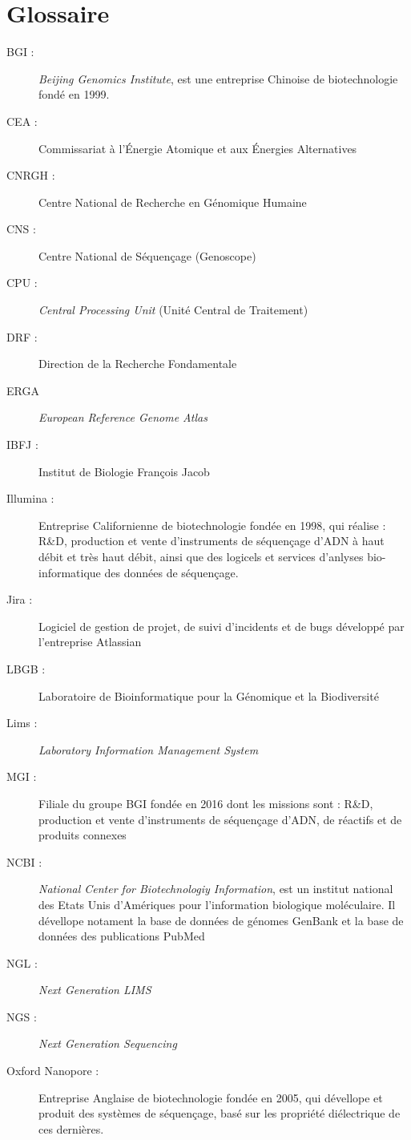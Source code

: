 \section*{Glossaire}

\begin{description}
    \item[BGI : ] \emph{Beijing Genomics Institute}, est une entreprise Chinoise de biotechnologie fondé en 1999.
    \item[CEA :] Commissariat à l'Énergie Atomique et aux Énergies Alternatives
    \item[CNRGH :] Centre National de Recherche en Génomique Humaine 
    \item[CNS :] Centre National de Séquençage (Genoscope)
    \item[CPU :] \emph{Central Processing Unit} (Unité Central de Traitement)
    \item[DRF :] Direction de la Recherche Fondamentale
    \item[ERGA] \emph{European Reference Genome Atlas}
    \item[IBFJ :] Institut de Biologie François Jacob
    \item[Illumina :] Entreprise Californienne de biotechnologie fondée en 1998, qui réalise : R\&D, production et vente d’instruments de séquençage d’ADN à haut débit et très haut débit, ainsi que des logicels et services d'anlyses bio-informatique des données de séquençage.
    \item[Jira :] Logiciel de gestion de projet, de suivi d'incidents et de bugs développé par l'entreprise Atlassian
    \item[LBGB :] Laboratoire de Bioinformatique pour la Génomique et la Biodiversité
    \item[Lims :] \emph{Laboratory Information Management System}
    \item[MGI : ] Filiale du groupe BGI fondée en 2016 dont les missions sont : R\&D, production et vente d’instruments de séquençage 
    d’ADN, de réactifs et de produits connexes
    \item[NCBI :] \emph{National Center for Biotechnologiy Information}, est un institut national des Etats Unis d'Amériques pour l'information biologique moléculaire. Il dévellope notament la base de données de génomes GenBank et la base de données des publications PubMed
    \item[NGL :] \emph{Next Generation LIMS}
    \item[NGS :] \emph{Next Generation Sequencing}
    \item[Oxford Nanopore :] Entreprise Anglaise de biotechnologie fondée en 2005, qui dévellope et produit des systèmes de séquençage, basé sur les propriété diélectrique de ces dernières.

\end{description}
